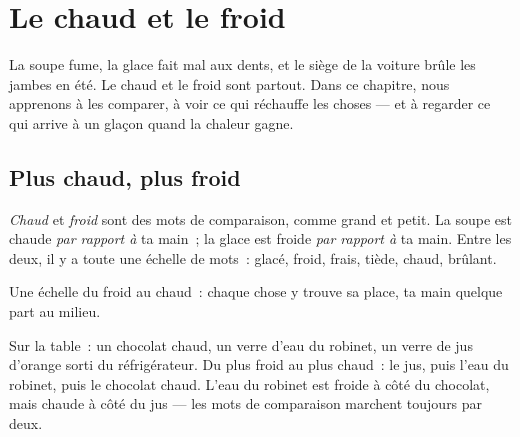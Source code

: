 \chapter{Le chaud et le froid}\label{ch:g1:hot-and-cold}

La soupe fume, la glace fait mal aux dents, et le siège de la voiture
brûle les jambes en été. Le chaud et le froid sont partout. Dans ce
chapitre, nous apprenons à les comparer, à voir ce qui réchauffe les
choses --- et à regarder ce qui arrive à un glaçon quand la chaleur
gagne.

\section{Plus chaud, plus froid}

\begin{definition}\label{def:g1:hot-and-cold:words}
\emph{Chaud} et \emph{froid} sont des mots
de comparaison, comme grand et petit. La soupe est chaude \emph{par
rapport à} ta main~; la glace est froide \emph{par rapport à} ta
main. Entre les deux, il y a toute une échelle de mots~: glacé,
froid, frais, tiède, chaud, brûlant.
\end{definition}

\begin{omfigure}

{\small Une échelle du froid au chaud~: chaque chose y trouve sa
place, ta main quelque part au milieu.}
\end{omfigure}

\begin{example}\label{ex:g1:hot-and-cold:drinks}
Sur la table~: un chocolat chaud, un verre d'eau du robinet, un verre
de jus d'orange sorti du réfrigérateur. Du plus froid au plus chaud~:
le jus, puis l'eau du robinet, puis le chocolat chaud. L'eau du
robinet est froide à côté du chocolat, mais chaude à côté du jus ---
les mots de comparaison marchent toujours par deux.
\end{example}

